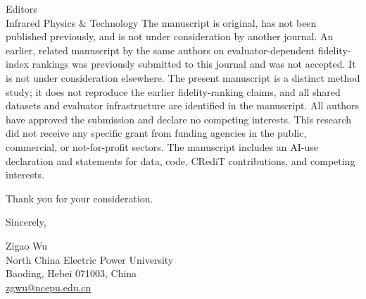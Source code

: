 \documentclass[a4paper,10pt]{letter}
\begin{document}
\begin{letter}{Editors\\Infrared Physics \& Technology}
The manuscript is original, has not been published previously, and is not under
consideration by another journal. An earlier, related manuscript by the same
authors on evaluator-dependent fidelity-index rankings was previously submitted
to this journal and was not accepted. It is not under consideration elsewhere.
The present manuscript is a distinct method study; it does not reproduce the
earlier fidelity-ranking claims, and all shared datasets and evaluator
infrastructure are identified in the manuscript. All authors have approved the
submission and declare no competing interests. This research did not receive any
specific grant from funding agencies in the public, commercial, or
not-for-profit sectors. The manuscript includes an AI-use declaration and
statements for data, code, CRediT contributions, and competing interests.

Thank you for your consideration.

\closing{Sincerely,}
Zigao Wu\\
North China Electric Power University\\
Baoding, Hebei 071003, China\\
\href{mailto:zgwu@ncepu.edu.cn}{zgwu@ncepu.edu.cn}
\end{letter}
\end{document}

